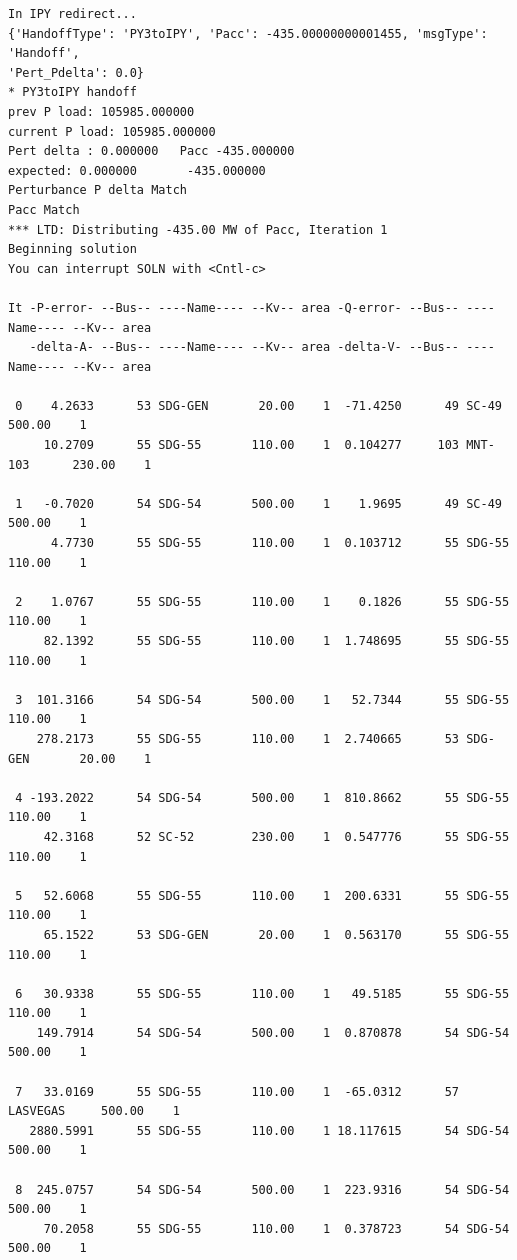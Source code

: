 \documentclass[12pt]{article}
\begin{document}
\begin{Verbatim}
In IPY redirect...
{'HandoffType': 'PY3toIPY', 'Pacc': -435.00000000001455, 'msgType': 'Handoff', 
'Pert_Pdelta': 0.0}
* PY3toIPY handoff
prev P load: 105985.000000
current P load: 105985.000000
Pert delta : 0.000000   Pacc -435.000000
expected: 0.000000       -435.000000
Perturbance P delta Match
Pacc Match
*** LTD: Distributing -435.00 MW of Pacc, Iteration 1
Beginning solution
You can interrupt SOLN with <Cntl-c>

It -P-error- --Bus-- ----Name---- --Kv-- area -Q-error- --Bus-- ----Name---- --Kv-- area
   -delta-A- --Bus-- ----Name---- --Kv-- area -delta-V- --Bus-- ----Name---- --Kv-- area

 0    4.2633      53 SDG-GEN       20.00    1  -71.4250      49 SC-49        500.00    1
     10.2709      55 SDG-55       110.00    1  0.104277     103 MNT-103      230.00    1

 1   -0.7020      54 SDG-54       500.00    1    1.9695      49 SC-49        500.00    1
      4.7730      55 SDG-55       110.00    1  0.103712      55 SDG-55       110.00    1

 2    1.0767      55 SDG-55       110.00    1    0.1826      55 SDG-55       110.00    1
     82.1392      55 SDG-55       110.00    1  1.748695      55 SDG-55       110.00    1

 3  101.3166      54 SDG-54       500.00    1   52.7344      55 SDG-55       110.00    1
    278.2173      55 SDG-55       110.00    1  2.740665      53 SDG-GEN       20.00    1

 4 -193.2022      54 SDG-54       500.00    1  810.8662      55 SDG-55       110.00    1
     42.3168      52 SC-52        230.00    1  0.547776      55 SDG-55       110.00    1

 5   52.6068      55 SDG-55       110.00    1  200.6331      55 SDG-55       110.00    1
     65.1522      53 SDG-GEN       20.00    1  0.563170      55 SDG-55       110.00    1

 6   30.9338      55 SDG-55       110.00    1   49.5185      55 SDG-55       110.00    1
    149.7914      54 SDG-54       500.00    1  0.870878      54 SDG-54       500.00    1

 7   33.0169      55 SDG-55       110.00    1  -65.0312      57 LASVEGAS     500.00    1
   2880.5991      55 SDG-55       110.00    1 18.117615      54 SDG-54       500.00    1

 8  245.0757      54 SDG-54       500.00    1  223.9316      54 SDG-54       500.00    1
     70.2058      55 SDG-55       110.00    1  0.378723      54 SDG-54       500.00    1


\end{Verbatim}
\end{document}
